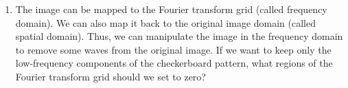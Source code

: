 \documentclass[a4paper, 12pt]{extarticle}
\begin{document}
\begin{enumerate}
\begin{center}
\end{center}

\item The image can be mapped to the Fourier transform grid (called frequency domain). We can also map it back to the original image domain (called spatial domain). Thus, we can manipulate the image in the frequency domain to remove some waves from the original image.
If we want to keep only the low-frequency components of the checkerboard pattern, what regions of the Fourier transform grid should we set to zero?

\end{enumerate}
\end{document}
